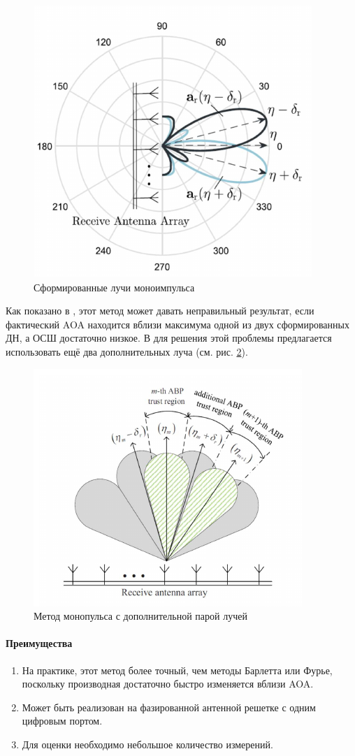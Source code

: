 \begin{figure}[ht!]
    \centering
    \includegraphics[width=0.45\linewidth]{figs/fig3.13}
    \caption{Сформированные лучи моноимпульса \cite{Zhu2016}}
    \label{fig:}
\end{figure}

Как показано в  \cite{Sherman2011},
этот метод может давать неправильный результат, если фактический AOA
находится вблизи максимума одной из двух сформированных ДН, а ОСШ достаточно низкое. 
В \cite{Sherman2011} для решения этой проблемы предлагается использовать ещё два дополнительных луча (см. рис. \ref{fig:3.14}).

\begin{figure}[ht!]
    \centering
    \includegraphics[width=0.6\linewidth]{figs/fig3.14}
    \caption{Метод монопульса с дополнительной парой лучей \cite{Tuncer2009}}
    \label{fig:3.14}
\end{figure}

\paragraph{Преимущества}%
\label{par:preimushchestva}

\begin{enumerate}
    \item На практике, этот метод более точный, чем методы Барлетта или Фурье, поскольку производная достаточно быстро изменяется вблизи AOA.
    \item Может быть реализован на фазированной антенной решетке с одним цифровым портом.
    \item Для оценки необходимо небольшое количество измерений. 
\end{enumerate}

